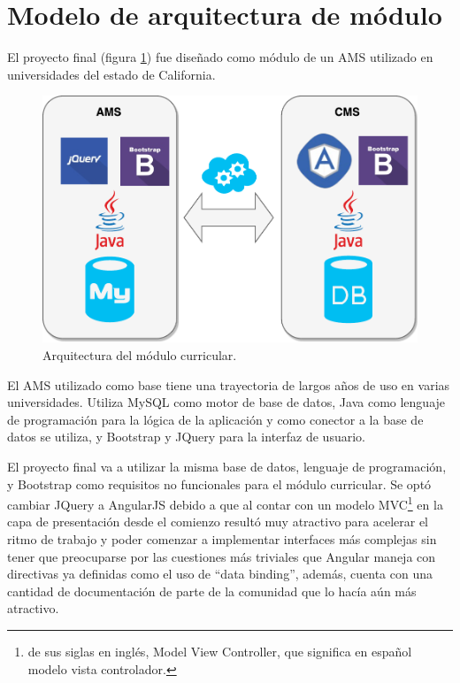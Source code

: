 \section{Modelo de arquitectura de módulo}

El proyecto final (figura \ref{arquitectura}) fue diseñado como módulo de un AMS utilizado en universidades del estado de California.

\begin{figure}[]
\centering
\includegraphics[scale=0.6]{Capitulos/PropuestadeSolucion/Imagenes/arquitectura}
\caption{Arquitectura del módulo curricular.}
  \label{arquitectura}
\end{figure}

El AMS utilizado como base tiene una trayectoria de largos años de uso en varias universidades. Utiliza MySQL como motor de base de datos, Java como lenguaje de programación para la lógica de la aplicación y como conector a la base de datos se utiliza, y Bootstrap y JQuery para la interfaz de usuario. 

El proyecto final va a utilizar la misma base de datos, lenguaje de programación, y Bootstrap como requisitos no funcionales para el módulo curricular. Se optó cambiar JQuery a AngularJS debido a que al contar con un modelo MVC\footnote{de sus siglas en inglés, Model View Controller, que significa en español modelo vista controlador.} en la capa de presentación desde el comienzo resultó muy atractivo para acelerar el ritmo de trabajo y poder comenzar a implementar interfaces más complejas sin tener que preocuparse por las cuestiones más triviales que Angular maneja con directivas ya definidas como el uso de \enquote{data binding}, además, cuenta con una cantidad de documentación de parte de la comunidad que lo hacía aún más atractivo.